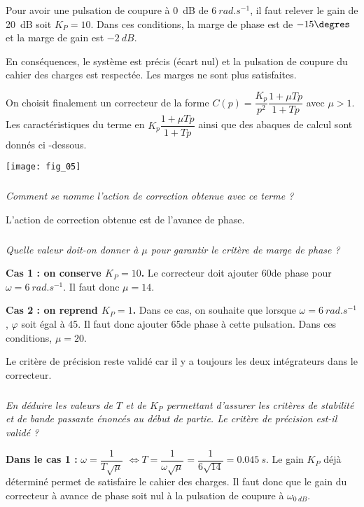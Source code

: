\begin{multicols}{2}
\begin{multicols}{2}
\begin{corrige}
Pour avoir une pulsation de coupure à \SI{0}{dB} de $\SI{6}{rad.s^{-1}}$, il faut relever le gain de \SI{20}{dB} soit $K_P=10$. Dans ces conditions, la marge de phase est de $-15\degres$ et la marge de gain est $\SI{-2}{dB}$. 

En conséquences, le système est précis (écart nul) et la pulsation de coupure du cahier des charges est respectée. Les marges ne sont plus satisfaites.  
\end{corrige}
\else
\fi

\ifprof
\else

On choisit finalement un correcteur de la forme $C(p)= \dfrac{K_p}{p^2}\dfrac{1+\mu Tp}{1+Tp}$ avec $\mu > 1$.
Les caractéristiques du terme en $K_p\dfrac{1+\mu Tp}{1+Tp}$  ainsi que des abaques de calcul sont donnés ci -dessous. 

\begin{center}
\texttt{[image: fig\_05]}
\end{center}
\fi

\subparagraph{}\textit{Comment se nomme l'action de correction obtenue avec ce terme ? }
\ifprof
\begin{corrige}
L'action de correction obtenue est de l'avance de phase. 
\end{corrige}
\else
\fi


\subparagraph{}\textit{Quelle valeur doit-on donner à $\mu$ pour garantir le critère de marge de phase ? }
\ifprof
\begin{corrige}
\textbf{Cas 1 : on conserve $K_P=10$.}
 Le correcteur doit ajouter 60\degres de phase pour $\omega=\SI{6}{rad.s^{-1}}$. Il faut donc $\mu=14$.
 
 \textbf{Cas 2 : on reprend $K_P=1$.}
 Dans ce cas, on souhaite que lorsque $\omega=\SI{6}{rad.s^{-1}}$, $\varphi$ soit égal à 45\degres. Il faut donc ajouter 65\degres de phase à cette pulsation. Dans ces conditions, $\mu=20$.
 
Le critère de précision reste validé car il y a toujours les deux intégrateurs dans le correcteur. 
\end{corrige}
\else
\fi


\subparagraph{}\textit{En déduire les valeurs de $T$ et de $K_P$ permettant d'assurer les critères de stabilité et de bande passante énoncés au début de partie. Le critère de précision est-il validé ?}
\ifprof
\begin{corrige}
\textbf{Dans le cas 1 :}
$\omega=\dfrac{1}{T\sqrt{\mu}}$ $ \Leftrightarrow T=\dfrac{1}{\omega\sqrt{\mu}}=\dfrac{1}{6\sqrt{14}}=\SI{0,045}{s}$.
Le gain $K_P$ déjà déterminé permet de satisfaire le cahier des charges. Il faut donc que le gain du correcteur à avance de phase soit nul à la pulsation de coupure à $\omega_{\SI{0}{dB}}$.


\end{corrige}
\end{multicols}
\end{multicols}
